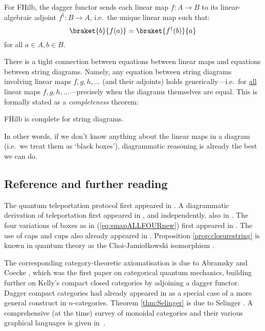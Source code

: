 \documentclass[10pt]{article}
\begin{document}
\begin{example}
For FHilb, the dagger functor sends each linear map $f : A \to B$ to its linear-algebraic adjoint $f^\dagger : B \to A$, i.e.~the unique linear map such that:
\[ 
\braket{b}{f(a)} = \braket{f^\dagger(b)}{a} 
\]
for all $a \in A, b\in B$.
\end{example}

There is a tight connection between equations between linear maps and equations between string diagrams. Namely, any equation between string diagrams involving linear maps $f, g, h, \ldots$ (and their adjoints) holds generically---i.e.~for \underline{all} linear maps $f, g, h, \ldots$---precisely when the diagrams themselves are equal. This is formally stated as a \textit{completeness} theorem:

\begin{theorem}\label{thm:Selinger}
  FHilb is complete for string diagrams.
\end{theorem}

In other words, if we don't know anything about the linear maps in a diagram (i.e.~we treat them as `black boxes'), diagrammatic reasoning is already the best we can do.

\subsection{Reference and further reading}

The quantum teleportation protocol first appeared in \cite{tele}. A diagrammatic derivation of teleportation first appeared in \cite{LE1}, and independently, also in \cite{Kauffman}.  The four variations of boxes as in (\ref{eq:smapALLFOURnew}) first appeared in \cite{SelingerCPM}. The use of caps and cups also already appeared in \cite{Penrose}. Proposition \ref{prop:closurestring} is known in quantum theory as the Choi-Jamio\l{}kowski isomorphism \cite{jamiolkowski, choi}.

The corresponding category-theoretic axiomatisation is due to Abramsky and Coecke \cite{AC1}, which was the first paper on categorical quantum mechanics, building further on Kelly's compact closed categories \cite{Kelly} by adjoining a dagger functor. Dagger compact categories had already appeared in \cite{BaezDolan} as a  special case of a more general construct in $n$-categories. Theorem \ref{thm:Selinger} is due to Selinger \cite{Selingercompleteness}. A comprehensive (at the time) survey of monoidal categories and their various graphical languages is given in~\cite{SelingerSurvey}.
\end{document}
